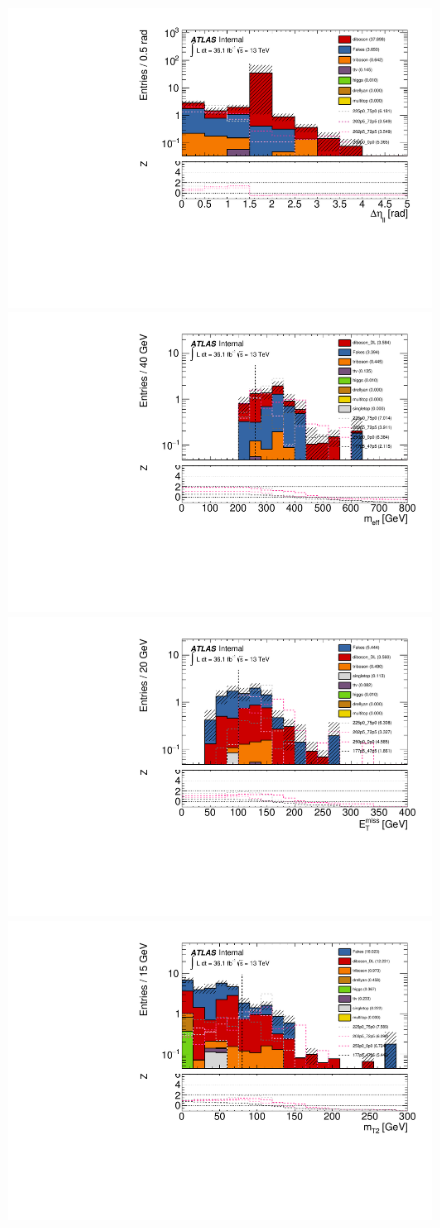\begin{figure}[htpb]
\centering
\includegraphics[width=0.45\linewidth]{data/plot/SR_redefinition/SRjet1/hDeltaEtaLep_fakes_upd.pdf}\includegraphics[width=0.45\linewidth]{data/plot/SR_redefinition/SRjet1/lemeff_fakes.pdf}\\
\includegraphics[width=0.45\linewidth]{data/plot/SR_redefinition/SRjet1/lemet_fakes.pdf}\includegraphics[width=0.45\linewidth]{data/plot/SR_redefinition/SRjet1/lemt2ll_fakes.pdf}\\

\end{figure}
